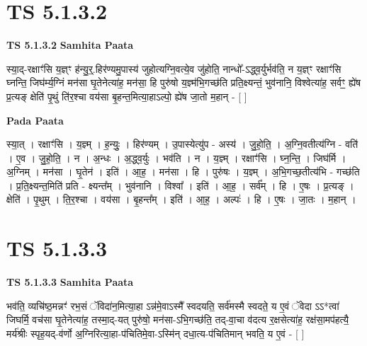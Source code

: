 \documentclass[17pt]{extarticle}
\begin{document}

\section{ TS 5.1.3.2 }

\textbf{TS 5.1.3.2 } \newline
\textbf{Samhita Paata} \newline

स्या॒द्-रक्षाꣳ॑सि य॒ज्ञ्ꣳ ह॑न्यु॒र्॒.हिर॑ण्यमु॒पास्य॑ जुहोत्यग्नि॒वत्ये॒व जु॑होति॒ नान्धो᳚-ऽद्ध्व॒र्युर्भव॑ति॒ न य॒ज्ञ्ꣳ रक्षाꣳ॑सि घ्नन्ति॒ जिघ॑र्म्य॒ग्निं मन॑सा घृ॒तेनेत्या॑ह॒ मन॑सा॒ हि पुरु॑षो य॒ज्ञ्म॑भि॒गच्छ॑ति प्रति॒क्ष्यन्तं॒ भुव॑नानि॒ विश्वेत्या॑ह॒ सर्वꣳ॒॒ ह्ये॑ष प्र॒त्यङ् क्षेति॑ पृ॒थुं ति॑र॒श्चा वय॑सा बृ॒हन्त॒मित्या॒हाऽल्पो॒ ह्ये॑ष जा॒तो म॒हान् - [  ] \newline

\textbf{Pada Paata} \newline

स्या॒त् । रक्षाꣳ॑सि । य॒ज्ञ्म् । ह॒न्युः॒ । हिर॑ण्यम् । उ॒पास्येत्यु॑प - अस्य॑ । जु॒हो॒ति॒ । अ॒ग्नि॒वतीत्य॑ग्नि - वति॑ । ए॒व । जु॒हो॒ति॒ । न । अ॒न्धः । अ॒द्ध्व॒र्युः । भव॑ति । न । य॒ज्ञ्म् । रक्षाꣳ॑सि । घ्न॒न्ति॒ । जिघ॑र्मि । अ॒ग्निम् । मन॑सा । घृ॒तेन॑ । इति॑ । आ॒ह॒ । मन॑सा । हि । पुरु॑षः । य॒ज्ञ्म् । अ॒भि॒गच्छ॒तीत्य॑भि - गच्छ॑ति । प्र॒ति॒क्ष्यन्त॒मिति॑ प्रति - क्ष्यन्त᳚म् । भुव॑नानि । विश्वा᳚ । इति॑ । आ॒ह॒ । सर्व᳚म् । हि । ए॒षः । प्र॒त्यङ् । क्षेति॑ । पृ॒थुम् । ति॒र॒श्चा । वय॑सा । बृ॒हन्त᳚म् । इति॑ । आ॒ह॒ । अल्पः॑ । हि । ए॒षः । जा॒तः । म॒हान् ।  \newline





\section{ TS 5.1.3.3 }

\textbf{TS 5.1.3.3 } \newline
\textbf{Samhita Paata} \newline

भव॑ति॒ व्यचि॑ष्ठ॒मन्नꣳ॑ रभ॒सं ॅविदा॑न॒मित्या॒हा ऽन्न॑मे॒वाऽस्मै᳚ स्वदयति॒ सर्व॑मस्मै स्वदते॒ य ए॒वं ॅवेदा ऽऽ*त्वा॑ जिघर्मि॒ वच॑सा घृ॒तेनेत्या॑ह॒ तस्मा॒द्-यत् पुरु॑षो॒ मन॑सा-ऽभि॒गच्छ॑ति॒ तद्-वा॒चा व॑दत्य र॒क्षसेत्या॑ह॒ रक्ष॑सा॒मप॑हत्यै॒ मर्य॑श्रीः स्पृह॒यद्-व॑र्णो अ॒ग्निरित्या॒हा-प॑चितिमे॒वा-ऽस्मि॑न् दधा॒त्य-प॑चितिमान् भवति॒ य ए॒वं - [  ] \newline
\end{document}
